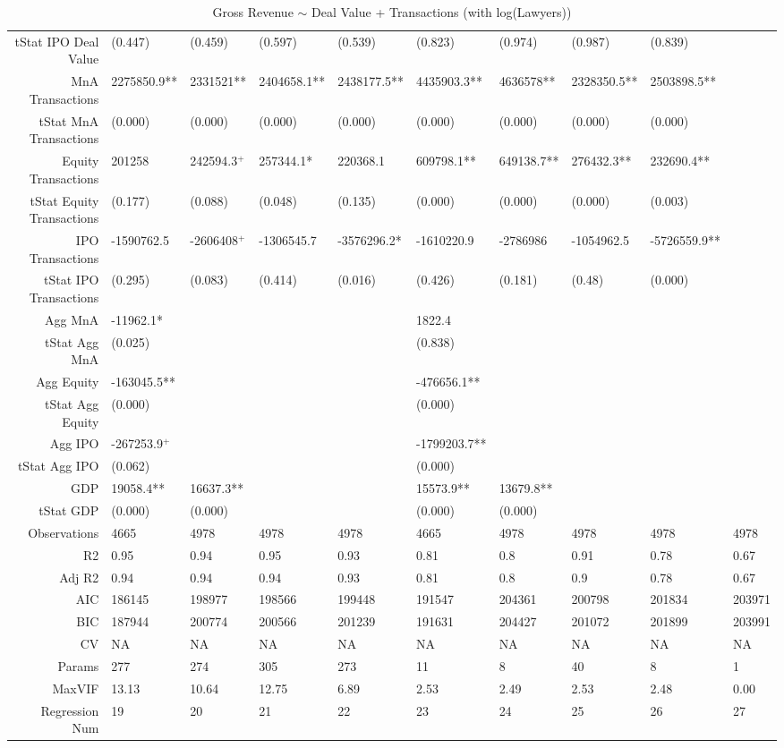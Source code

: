\begin{table}[ht]
\begin{tabular}{rlllllllll}
  tStat IPO Deal Value & (0.447) & (0.459) & (0.597) & (0.539) & (0.823) & (0.974) & (0.987) & (0.839) &  \\ 
  MnA Transactions & 2275850.9** & 2331521** & 2404658.1** & 2438177.5** & 4435903.3** & 4636578** & 2328350.5** & 2503898.5** &  \\ 
  tStat MnA Transactions & (0.000) & (0.000) & (0.000) & (0.000) & (0.000) & (0.000) & (0.000) & (0.000) &  \\ 
  Equity Transactions & 201258 & 242594.3$^{+}$ & 257344.1* & 220368.1 & 609798.1** & 649138.7** & 276432.3** & 232690.4** &  \\ 
  tStat Equity Transactions & (0.177) & (0.088) & (0.048) & (0.135) & (0.000) & (0.000) & (0.000) & (0.003) &  \\ 
  IPO Transactions & -1590762.5 & -2606408$^{+}$ & -1306545.7 & -3576296.2* & -1610220.9 & -2786986 & -1054962.5 & -5726559.9** &  \\ 
  tStat IPO Transactions & (0.295) & (0.083) & (0.414) & (0.016) & (0.426) & (0.181) & (0.48) & (0.000) &  \\ 
  Agg MnA & -11962.1* &  &  &  & 1822.4 &  &  &  &  \\ 
  tStat Agg MnA & (0.025) &  &  &  & (0.838) &  &  &  &  \\ 
  Agg Equity & -163045.5** &  &  &  & -476656.1** &  &  &  &  \\ 
  tStat Agg Equity & (0.000) &  &  &  & (0.000) &  &  &  &  \\ 
  Agg IPO & -267253.9$^{+}$ &  &  &  & -1799203.7** &  &  &  &  \\ 
  tStat Agg IPO & (0.062) &  &  &  & (0.000) &  &  &  &  \\ 
  GDP & 19058.4** & 16637.3** &  &  & 15573.9** & 13679.8** &  &  &  \\ 
  tStat GDP & (0.000) & (0.000) &  &  & (0.000) & (0.000) &  &  &  \\ 
  Observations & 4665 & 4978 & 4978 & 4978 & 4665 & 4978 & 4978 & 4978 & 4978 \\ 
  R2 & 0.95 & 0.94 & 0.95 & 0.93 & 0.81 & 0.8 & 0.91 & 0.78 & 0.67 \\ 
  Adj R2 & 0.94 & 0.94 & 0.94 & 0.93 & 0.81 & 0.8 & 0.9 & 0.78 & 0.67 \\ 
  AIC & 186145 & 198977 & 198566 & 199448 & 191547 & 204361 & 200798 & 201834 & 203971 \\ 
  BIC & 187944 & 200774 & 200566 & 201239 & 191631 & 204427 & 201072 & 201899 & 203991 \\ 
  CV & NA & NA & NA & NA & NA & NA & NA & NA & NA \\ 
  Params & 277 & 274 & 305 & 273 & 11 & 8 & 40 & 8 & 1 \\ 
  MaxVIF & 13.13 & 10.64 & 12.75 & 6.89 & 2.53 & 2.49 & 2.53 & 2.48 & 0.00 \\ 
  Regression Num & 19 & 20 & 21 & 22 & 23 & 24 & 25 & 26 & 27 \\ 
   \hline
\end{tabular}
\caption{Gross Revenue $\sim$ Deal Value + Transactions (with log(Lawyers))} 
\end{table}

